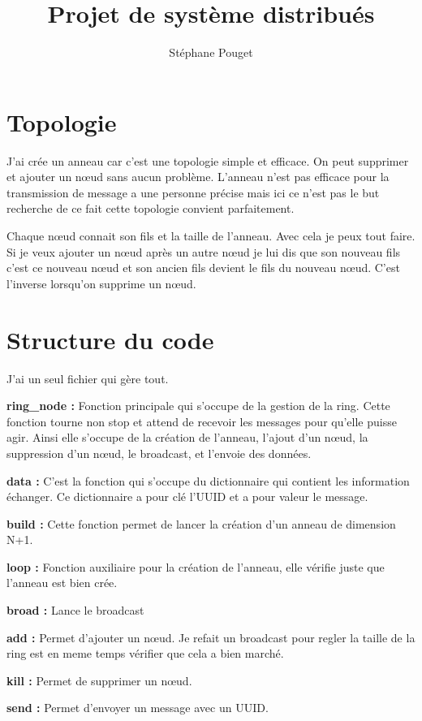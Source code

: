\documentclass[12pt,a4paper]{article}
\author{Stéphane Pouget}
\title{Projet de système distribués}
\begin{document}
\maketitle

\section{Topologie}

J'ai crée un anneau car c'est une topologie simple et efficace. On peut supprimer et ajouter un nœud sans aucun problème. L'anneau n'est pas efficace pour la transmission de message a une personne précise mais ici ce n'est pas le but recherche de ce fait cette topologie convient parfaitement.

Chaque nœud connait son fils et la taille de l'anneau. Avec cela je peux tout faire. Si je veux ajouter un nœud après un autre nœud je lui dis que son nouveau fils c'est ce nouveau nœud et son ancien fils devient le fils du nouveau nœud. C'est l'inverse lorsqu'on supprime un nœud.

\section{Structure du code}

J'ai un seul fichier qui gère tout. 

\textbf{ring\_node : } Fonction principale qui s'occupe de la gestion de la ring. Cette fonction tourne non stop et attend de recevoir les messages pour qu'elle puisse agir. Ainsi elle s'occupe de la création de l'anneau, l'ajout d'un nœud, la suppression d'un nœud, le broadcast, et l'envoie des données.

\textbf{data : } C'est la fonction qui s'occupe du dictionnaire qui contient les information échanger. Ce dictionnaire a pour clé l'UUID et a pour valeur le message.

\textbf{build : } Cette fonction permet de lancer la création d'un anneau de dimension N+1.

\textbf{loop : } Fonction auxiliaire pour la création de l'anneau, elle vérifie juste que l'anneau est bien crée.

\textbf{broad : } Lance le broadcast

\textbf{add : } Permet d'ajouter un nœud. Je refait un broadcast pour regler la taille de la ring est en meme temps vérifier que cela a bien marché.

\textbf{kill : } Permet de supprimer un nœud.

\textbf{send : } Permet d'envoyer un message avec un UUID.
\end{document}
